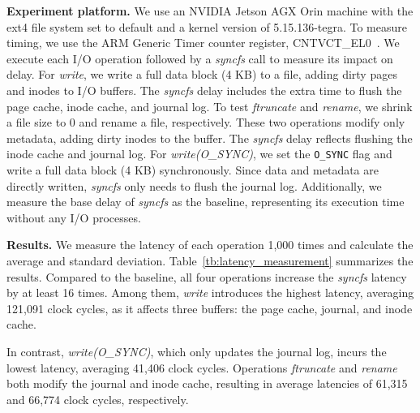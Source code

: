 \textbf{{Experiment platform.}} We use an NVIDIA Jetson AGX Orin machine with the ext4 file system set to default and a kernel version of 5.15.136-tegra. To measure timing, we use the ARM Generic Timer counter register, CNTVCT\_EL0~\cite{arm_ctr}. We execute each I/O operation followed by a \textit{syncfs} call to measure its impact on delay. For \textit{write}, we write a full data block (4 KB) to a file, adding dirty pages and inodes to I/O buffers. The \textit{syncfs} delay includes the extra time to flush the page cache, inode cache, and journal log. 
To test \textit{ftruncate} and \textit{rename}, we shrink a file size to 0 and rename a file, respectively. These two operations modify only metadata, adding dirty inodes to the buffer. The \textit{syncfs} delay reflects flushing the inode cache and journal log.  For \textit{write(O\_SYNC)}, we set the \texttt{O\_SYNC} flag and write a full data block (4 KB) synchronously. Since data and metadata are directly written, \textit{syncfs} only needs to flush the journal log. Additionally, we measure the base delay of \textit{syncfs} as the baseline, representing its execution time without any I/O processes. 

\textbf{Results.} We measure the latency of each operation 1,000 times and calculate the average and standard deviation. Table~\ref{tb:latency_measurement} summarizes the results. Compared to the baseline, all four operations increase the \textit{syncfs} latency by at least 16 times. Among them, \textit{write} introduces the highest latency, averaging 121,091 clock cycles, as it affects three buffers: the page cache, journal, and inode cache. 

In contrast, \textit{write(O\_SYNC)}, which only updates the journal log, incurs the lowest latency, averaging 41,406 clock cycles. Operations \textit{ftruncate} and \textit{rename} both modify the journal and inode cache, resulting in average latencies of 61,315 and 66,774 clock cycles, respectively.




